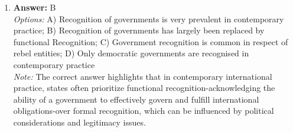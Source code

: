 \documentclass[12pt]{article}
\begin{document}
\begin{enumerate}[label=\arabic*.]
\\ \textit{Note:} Dworkin supports liberal egalitarianism because it emphasizes the importance of personal choice in determining individuals' life outcomes, rather than leaving those outcomes to the whims of chance or luck, thereby promoting fairness and equality in society.
\item \textbf{Answer:} B
\\ \textit{Options:} A) Recognition of governments is very prevalent in contemporary practice; B) Recognition of governments has largely been replaced by functional Recognition; C) Government recognition is common in respect of rebel entities; D) Only democratic governments are recognised in contemporary practice
\\ \textit{Note:} The correct answer highlights that in contemporary international practice, states often prioritize functional recognition-acknowledging the ability of a government to effectively govern and fulfill international obligations-over formal recognition, which can be influenced by political considerations and legitimacy issues.
\end{enumerate}
\end{document}
